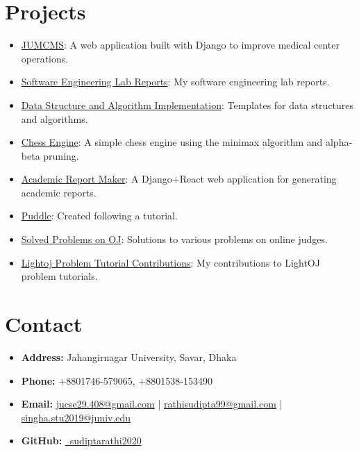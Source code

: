 \documentclass[a4paper,10pt]{article}
\begin{document}
\section*{Projects}
\begin{itemize}[leftmargin=0.5cm]
    \item \href{https://github.com/sudiptarathi2020/JUMCMS-Jahangirnagar-University-Medical-Center-Management-System.git}{JUMCMS}: A web application built with Django to improve medical center operations.
    \item \href{https://github.com/sudiptarathi2020/Software-Engineering-Lab-CSE404-Reports.git}{Software Engineering Lab Reports}: My software engineering lab reports.
    \item \href{https://github.com/sudiptarathi2020/Data-structures-and-Algorithms.git}{Data Structure and Algorithm Implementation}: Templates for data structures and algorithms.
    \item \href{https://github.com/sudiptarathi2020/Simple-Chess-Engine.git}{Chess Engine}: A simple chess engine using the minimax algorithm and alpha-beta pruning.
    \item \href{https://github.com/sudiptarathi2020/academic-report-maker.git}{Academic Report Maker}: A Django+React web application for generating academic reports.
    \item \href{https://github.com/sudiptarathi2020/puddle.git}{Puddle}: Created following a tutorial.
    \item \href{https://github.com/sudiptarathi2020/Problem-Solves.git}{Solved Problems on OJ}: Solutions to various problems on online judges.
    \item \href{https://github.com/sudiptarathi2020/problem-tutorials.git}{Lightoj Problem Tutorial Contributions}: My contributions to LightOJ problem tutorials.
\end{itemize}

\section*{Contact}
\begin{itemize}[leftmargin=0.5cm]
    \item \textbf{Address:} Jahangirnagar University, Savar, Dhaka
    \item \textbf{Phone:} +8801746-579065, +8801538-153490
    \item \textbf{Email:} \href{mailto:jucse29.408@gmail.com}{jucse29.408@gmail.com} | \href{mailto:rathisudipta99@gmail.com}{rathisudipta99@gmail.com} | \href{mailto:singha.stu2019@juniv.edu}{singha.stu2019@juniv.edu}
    \item \textbf{GitHub:} \href{https://github.com/sudiptarathi2020}{\faGithub \ sudiptarathi2020}
\end{itemize}
\end{document}
